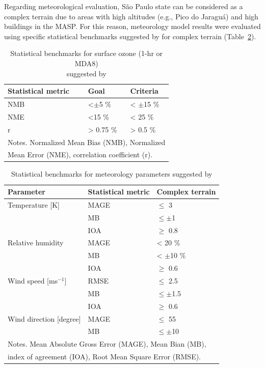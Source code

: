   Regarding meteorological evaluation, S\~{a}o Paulo state can be considered as a complex terrain due to areas with high altitudes (e.g., Pico do Jaragu\'{a}) and high buildings in the MASP.
  For this reason, meteorology model results were evaluated using specific statistical benchmarks suggested by \citet{Monk2019} for complex terrain (Table~\ref{tab:met_bench}).
  
  \begin{table}
	\centering
	\caption{Statistical benchmarks for surface ozone (1-hr or MDA8) \\ suggested by \citet{Emery2017}}
	\label{tab:ozone_bench}
	\begin{tabular}{lll}
  		\toprule
  		Statistical metric & Goal & Criteria \\
  		\midrule
  		NMB 	& <$\pm$5 \% 	& < $\pm$15 \% \\
  		NME    	& <15 \%		& < 25 \% \\
  		r		& > 0.75 \% 		& > 0.5 \% \\
  		\bottomrule
  		\multicolumn{3}{l}{\footnotesize Notes. Normalized Mean Bias (NMB), Normalized}\\
  		\multicolumn{3}{l}{\footnotesize Mean Error (NME), correlation coefficient (r).}
	\end{tabular}
 \end{table}
  
  \begin{table}
	\centering
	\caption{Statistical benchmarks for meteorology parameters suggested by \citet{Monk2019}}
	\label{tab:met_bench}
	\begin{tabular}{lll}
	\toprule
  	Parameter & Statistical metric & Complex terrain \\
 	 \midrule
  	Temperature [K]			& MAGE &  $\leq$ 3 \\
  		  					& MB   &  $\leq \pm$1\\
  	      					& IOA  &  $\geq$ 0.8 \\ 
  	Relative humidity   		& MAGE & < 20 \% \\
  							& MB   & < $\pm$10 \%\\
  							& IOA  &  $\geq$ 0.6\\
  	Wind speed [ms$^{-1}$]	& RMSE & $\leq$ 2.5\\
  							& MB   & $\leq \pm$1.5 \\
  							& IOA  & $\geq$ 0.6\\
  	Wind direction [degree] & MAGE & $\leq$ 55	\\
  							& MB   & $\leq \pm$10  \\
  	\bottomrule
  	\multicolumn{3}{l}{\footnotesize Notes. Mean Absolute Gross Error (MAGE), Mean Bian (MB), }\\
  	\multicolumn{3}{l}{\footnotesize index of agreement (IOA), Root Mean Square Error (RMSE).}
  	\end{tabular}
\end{table}

